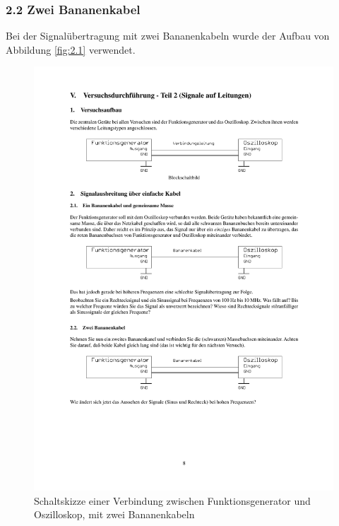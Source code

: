 \documentclass[12pt,a4paper]{article}
\begin{document}
\subsubsection{2.2 Zwei Bananenkabel}

Bei der Signalübertragung mit zwei Bananenkabeln wurde der Aufbau von Abbildung \ref{fig:2.1} verwendet.

\begin{figure}[H] 
  \centering
    \includegraphics[trim = 10mm 70mm 10mm 200mm, clip, scale = 1]{2_0-2_2.pdf}
  	\caption[Schaltskizze einer Verbindung zwischen Funktionsgenerator und Oszilloskop, mit zwei Bananenkabeln]{Schaltskizze einer Verbindung zwischen Funktionsgenerator und Oszilloskop, mit zwei Bananenkabeln\footnotemark}
  \label{fig:2.2}
\end{figure}
\end{document}
